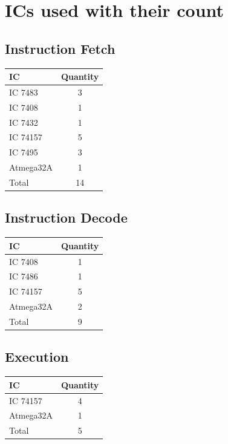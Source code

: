 \documentclass[12pt]{article}
\begin{document}
\section{\large{ICs used with their count}}
\label{IC}
\subsection{Instruction Fetch}
\begin{table}[h]
    \centering
    \begin{tabular}{lc}
    \textbf{IC} & \textbf{Quantity} \\
    \hline \hline
    IC 7483 & 3 \\
    IC 7408 & 1 \\
    IC 7432 & 1 \\    
    IC 74157 & 5 \\    
    IC 7495 & 3 \\
    Atmega32A & 1 \\
    \hline
    Total & 14
\end{tabular}
\end{table}

\subsection{Instruction Decode}
\begin{table}[h]
    \centering
    \begin{tabular}{lc}
    \textbf{IC} & \textbf{Quantity} \\
    \hline \hline
    IC 7408 & 1 \\
    IC 7486 & 1 \\ 
    IC 74157 & 5 \\
    Atmega32A & 2 \\
    \hline
    Total & 9
\end{tabular}

\end{table}
\subsection{Execution}
\begin{table}[h]
    \centering
    \begin{tabular}{lc}
    \textbf{IC} & \textbf{Quantity} \\
    \hline \hline
    IC 74157 & 4 \\
    Atmega32A & 1 \\
    \hline
    Total & 5
\end{tabular}
\end{table}
\end{document}
